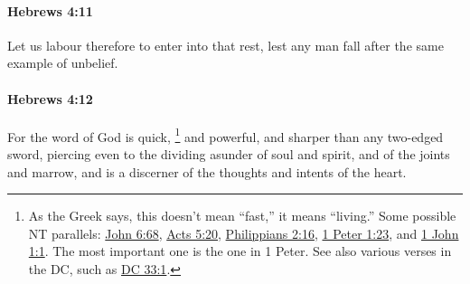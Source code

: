 		\paragraph{Hebrews 4:11} %
			\label{HEBREWS-4-11}

			Let us labour therefore to enter into that rest, lest any man fall after the same example of unbelief.

			\begin{framed}
			\scriptsize
				\begin{compactdesc}
					\item[SBLG] 
				\end{compactdesc}
			\end{framed}

		\paragraph{Hebrews 4:12} %
			\label{HEBREWS-4-12}

			For the word of God is quick,%
				\footnote{%
					As the Greek says, this doesn't mean ``fast,'' it means ``living.'' Some possible NT parallels: \hyperref[JOHN-6-68]{John 6:68}, \hyperref[ACTS-5-20]{Acts 5:20}, \hyperref[PHILIPPIANS-2-16]{Philippians 2:16}, \hyperref[1PETER-1-23]{1 Peter 1:23}, and \hyperref[1JOHN-1-1]{1 John 1:1}. The most important one is the one in 1 Peter. See also various verses in the DC, such as \hyperref[DC33-1]{DC 33:1}.
					}
			and powerful, and sharper than any two-edged sword, piercing even to the dividing asunder of soul and spirit, and of the joints and marrow, and is a discerner of the thoughts and intents of the heart.

